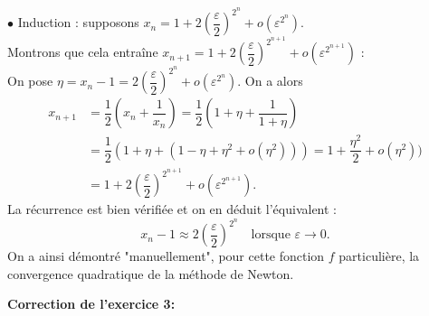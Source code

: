 \documentclass[11pt,a4paper]{article}
\begin{document}
\begin{enumerate}
$\bullet$ Induction :
supposons $x_n = 1 + 2\left(\dfrac{\varepsilon}{2}\right)^{2^n}+ o(\varepsilon^{2^n})$.\\
Montrons que cela entraîne $x_{n+1} =1 + 2\left(\dfrac{\varepsilon}{2}\right)^{2^{n+1}}+ o(\varepsilon^{2^{n+1}})$ :\\
On pose $\eta = x_n-1 = 2\left(\dfrac{\varepsilon}{2}\right)^{2^n}+ o(\varepsilon^{2^n})$. On a alors
$$
\begin{array}{rl}
x_{n+1} &= \dfrac{1}{2}\left(x_n + \dfrac{1}{x_n}\right) = \dfrac{1}{2}\left(1+\eta + \dfrac{1}{1+\eta}\right)\\
&= \dfrac{1}{2}\left(1+\eta+(1-\eta+\eta^2+o(\eta^2))\right) = 1+\dfrac{\eta^2}{2}+o(\eta^2))\\
&= 1+2\left(\dfrac{\varepsilon}{2}\right)^{2^{n+1}}+ o(\varepsilon^{2^{n+1}}).
\end{array}
$$
La récurrence est bien vérifiée et on en déduit l'équivalent :
$$
x_n -1 \approx 2\left(\dfrac{\varepsilon}{2}\right)^{2^n}\quad\mbox{lorsque } \varepsilon\to 0.
$$
On a ainsi démontré "manuellement", pour cette fonction $f$ particulière, la convergence quadratique de la méthode de Newton.
\end{enumerate}

{\bf Correction de l'exercice 3:} \vspace{0.1cm}\\
\end{document}
